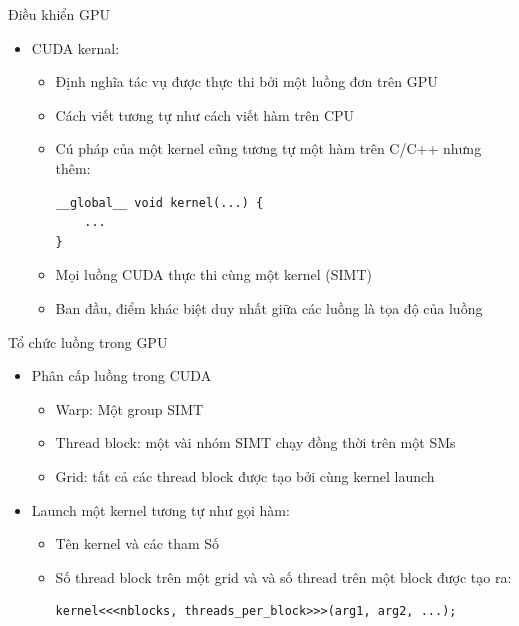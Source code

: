 \documentclass[10pt]{beamer}
\theoremstyle{remark}
\numberwithin{algocf}{section}
\numberwithin{equation}{section}
\numberwithin{dl}{section}
\numberwithin{figure}{section}
\begin{document}
\begin{frame}[fragile]{Điều khiển GPU}
    \begin{itemize}
        \item CUDA kernal:
        \begin{itemize}
            \item Định nghĩa tác vụ được thực thi bởi một luồng đơn trên GPU
            \item Cách viết tương tự như cách viết hàm trên CPU
            \item Cú pháp của một kernel cũng tương tự một hàm trên C/C++ nhưng thêm:
            \begin{verbatim}
__global__ void kernel(...) {
    ...
}
            \end{verbatim}
            \item Mọi luồng CUDA thực thi cùng một kernel (SIMT)
            \item Ban đầu, điểm khác biệt duy nhất giữa các luồng là tọa độ của luồng
        \end{itemize}
    \end{itemize}
\end{frame}

\begin{frame}[fragile]{Tổ chức luồng trong GPU}
    \begin{itemize}
        \item Phân cấp luồng trong CUDA 
        \begin{itemize}
            \item Warp: Một group SIMT
            \item Thread block: một vài nhóm SIMT chạy đồng thời trên một SMs
            \item Grid: tất cả các thread block được tạo bởi cùng kernel launch
        \end{itemize}
        \item Launch một kernel tương tự như gọi hàm:
        \begin{itemize}
            \item Tên kernel và các tham Số
            \item Số thread block trên một grid và và số thread trên một block được tạo ra:
            \begin{verbatim}
kernel<<<nblocks, threads_per_block>>>(arg1, arg2, ...);                
            \end{verbatim}
        \end{itemize}
    \end{itemize}
\end{frame}
\end{document}
